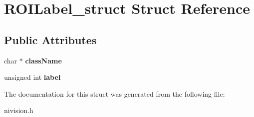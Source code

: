 \hypertarget{structROILabel__struct}{
\section{ROILabel\_\-struct Struct Reference}
\label{structROILabel__struct}
}
\subsection*{Public Attributes}
\begin{DoxyCompactItemize}
\item 
\hypertarget{structROILabel__struct_a73f9164c544e63ff4e6e0c16c9b7aaeb}{
char $\ast$ {\bfseries className}}
\label{structROILabel__struct_a73f9164c544e63ff4e6e0c16c9b7aaeb}

\item 
\hypertarget{structROILabel__struct_a69fe5c98819c33001a6d6deb40b795f4}{
unsigned int {\bfseries label}}
\label{structROILabel__struct_a69fe5c98819c33001a6d6deb40b795f4}

\end{DoxyCompactItemize}


The documentation for this struct was generated from the following file:\begin{DoxyCompactItemize}
\item 
nivision.h\end{DoxyCompactItemize}
